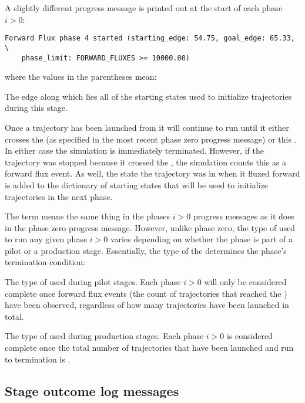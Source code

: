 {A slightly different progress message is printed out at the start of each phase $i>0$:
\begin{verbatim}
Forward Flux phase 4 started (starting_edge: 54.75, goal_edge: 65.33, \
    phase_limit: FORWARD_FLUXES >= 10000.00)
\end{verbatim}
where the values in the parentheses mean:
\begin{description}[style=nextline]
    \item[] The edge along which lies all of the starting states used to initialize trajectories during this stage.
    \item[\code{goal_edge}] Once a trajectory has been launched from \code{starting_edge} it will continue to run until it either crosses the  (as specified in the most recent phase zero progress message) or this . In either case the simulation is immediately terminated. However, if the trajectory was stopped because it crossed the , the simulation counts this as a forward flux event. As well, the state the trajectory was in when it fluxed forward is added to the dictionary of starting states that will be used to initialize trajectories in the next phase.
\end{description}
The  term means the same thing in the phases $i>0$ progress messages as it does in the phase zero progress message. However, unlike phase zero, the type of  used to run any given phase $i>0$ varies depending on whether the phase is part of a pilot or a production stage. Essentially, the type of the  determines the phase's termination condition:
\begin{description}[style=nextline]
    \item[\code{FORWARD_FLUXES >= n}] 
    The type of  used during pilot stages. Each phase $i>0$ will only be considered complete once  forward flux events (\ie the count of trajectories that reached the ) have been observed, regardless of how many trajectories have been launched in total.
    \item[\code{TRAJECTORY_COUNT >= n}] 
    The type of  used during production stages. Each phase $i>0$ is considered complete once the total number of trajectories that have been launched and run to termination is .
\end{description}

\subsection{Stage outcome log messages}

}
